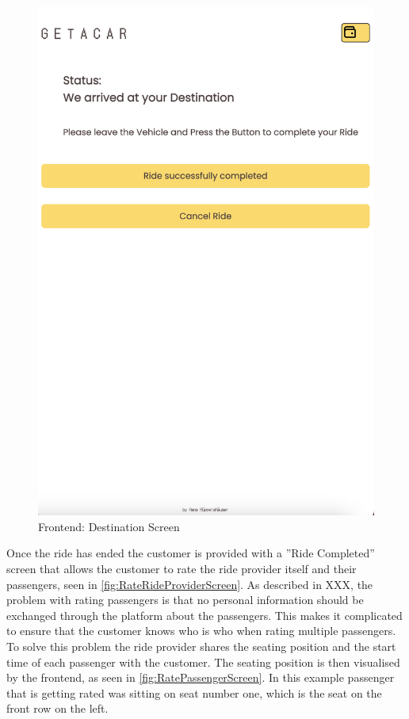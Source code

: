 \begin{figure}[H]
\begin{minipage}{0.45\linewidth}
        \includegraphics[width=\linewidth]{data/ffss/10.png}
        \caption{Frontend: Destination Screen}
        \label{fig:DestinationScreen}
    \end{minipage}
    
\end{figure}

Once the ride has ended the customer is provided with a ''Ride Completed'' screen that allows the customer to rate the ride provider itself and their passengers, seen in \ref{fig:RateRideProviderScreen}. As described in XXX, the problem with rating passengers is that no personal information should be exchanged through the platform about the passengers. This makes it complicated to ensure that the customer knows who is who when rating multiple passengers. To solve this problem the ride provider shares the seating position and the start time of each passenger with the customer. The seating position is then visualised by the frontend, as seen in \ref{fig:RatePassengerScreen}. In this example passenger that is getting rated was sitting on seat number one, which is the seat on the front row on the left. 



